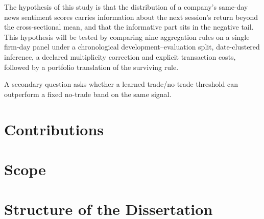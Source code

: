 \documentclass[11pt,a4paper,oneside]{book}
\newif\ifshowdraftnotes
\newcommand{\draftnote}[1]{%
  \ifshowdraftnotes
    \par\smallskip
    \noindent{\color{draftgrey}\small\itshape Drafting note: #1\par}
    \smallskip
  \fi
}
\begin{document}
The hypothesis of this study is that the distribution of a company's same-day news sentiment scores carries information about the next session's return beyond the cross-sectional mean, and that the informative part sits in the negative tail.
This hypothesis will be tested by comparing nine aggregation rules on a single firm-day panel under a chronological development--evaluation split, date-clustered inference, a declared multiplicity correction and explicit transaction costs, followed by a portfolio translation of the surviving rule.

A secondary question asks whether a learned trade/no-trade threshold can outperform a fixed no-trade band on the same signal.

\draftnote{Keep the two questions in this order and state up front that null answers are reported as results. The primary maps to candidate RQ-A and the secondary to RQ-E in the Gate F1 record.}

\section{Contributions}
\label{sec:contributions}

\draftnote{Three bounded contributions: (1) a like-for-like comparison of nine aggregation rules under one inference regime on 715{,}546 firm-days plus a direct conditional test showing what negative share contributes beyond mean sentiment and story count; (2) the separation of statistical detectability from economic usability, with a cost frontier; (3) evidence that the surviving negative-tail signal can act as a downside-risk state in one FNSPID period, paired with an exact LSEG transfer that never activates and therefore draws a hard portability boundary.}

\section{Scope}
\label{sec:scope}

\draftnote{FNSPID 2011--2023 is the primary spine; the LSEG corpora are separate non-pooled robustness regimes. No deployable-alpha claim anywhere. The aggregation family ran before the final research question was fixed, so results are exploratory rather than confirmatory; say so here and again in the limitations.}

\section{Structure of the Dissertation}
\label{sec:outline}
\end{document}
